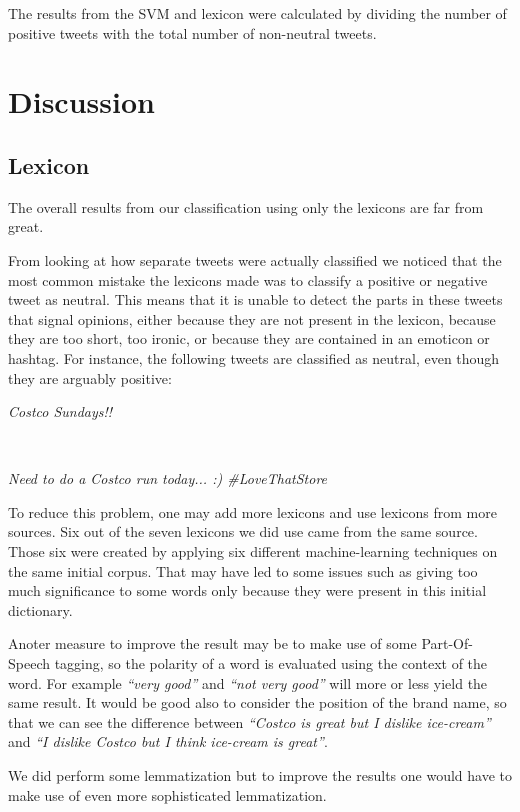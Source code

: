 \documentclass[a4paper,12pt]{report}
\begin{document}
The results from the SVM and lexicon were calculated by dividing the number of positive tweets with the total number of non-neutral tweets.

\chapter{Discussion}

\section{Lexicon}

The overall results from our classification using only the lexicons are far from great. 

From looking at how separate tweets were actually classified we noticed that the most common mistake the lexicons made was to classify a positive or negative tweet as neutral. 
This means that it is unable to detect the parts in these tweets that signal opinions, either because they are not present in the lexicon, because they are too short, too ironic, or because they are contained in an emoticon or hashtag.
For instance, the following tweets are classified as neutral, even though they are arguably positive:
\\
\centerline{\textit{Costco Sundays!!}}\\
\centerline{\textit{Need to do a Costco run today... :) \#LoveThatStore}}

To reduce this problem, one may add more lexicons and use lexicons from more sources. Six out of the seven lexicons we did use came from the same source. Those six were created by applying six different machine-learning techniques on the same initial corpus. That may have led to some issues such as giving too much significance to some words only because they were present in this initial dictionary.

Anoter measure to improve the result may be to make use of some Part-Of-Speech tagging, so the polarity of a word is evaluated using the context of the word. For example \emph{``very good''} and \emph{``not very good''} will more or less yield the same result. It would be good also to consider the position of the brand name, so that we can see the difference between \emph{``Costco is great but I dislike ice-cream''} and \emph{``I dislike Costco but I think ice-cream is great''}.

We did perform some lemmatization but to improve the results one would have to make use of even more sophisticated lemmatization.
\end{document}

